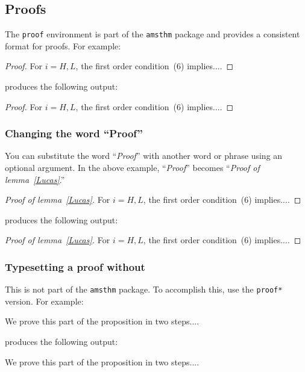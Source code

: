 \documentclass{cje}          %
\theoremstyle{plain}%
\theoremstyle{definition}
\theoremstyle{remark}
\begin{document}
\subsection{Proofs}
\label{proofs}

The \verb"proof" environment is part of the \texttt{amsthm} package and provides a consistent format for proofs.
 For example:
\begin{smallverbatim}
\begin{proof}
  For $i=H,L$, the first order condition~(6) implies....
\end{proof}
\end{smallverbatim}
produces the following output:
\begin{proof}
  For $i=H,L$, the first order condition~(6) implies....
\end{proof}

\subsubsection{Changing the word ``Proof''}

You can substitute the word ``\textit{Proof}'' with another word or phrase using an optional argument. In the above example, ``\textit{Proof}'' becomes ``\textit{Proof of lemma~\ref{Lucas}}.''  
\begin{smallverbatim}
\begin{proof}[Proof of lemma~\ref{Lucas}]
   For $i=H,L$, the first order condition~(6) implies....
\end{proof}
\end{smallverbatim}
produces the following output:
\begin{proof}[Proof of lemma~\ref{Lucas}]
   For $i=H,L$, the first order condition~(6) implies....
\end{proof}


\subsubsection{Typesetting a proof without \qedsymbol}

This is not part of the \texttt{amsthm} package. To accomplish this, use the \verb"proof*" version. For example:
\begin{smallverbatim}
\begin{proof*}
  We prove this part of the proposition in two steps....
\end{proof*}
\end{smallverbatim}
produces the following output:
\begin{proof*}
  We prove this part of the proposition in two steps....
\end{proof*}
\end{document}
